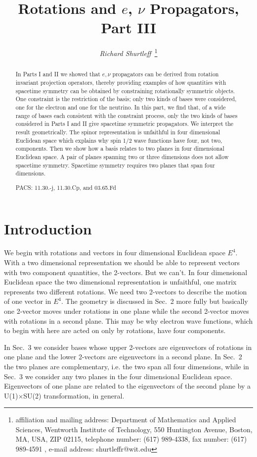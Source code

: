 \documentclass[a4paper,12pt]{article}
\title{ Rotations and $e$, $\nu$ Propagators, Part III}
\author{{\it Richard Shurtleff~}\thanks{affiliation and mailing 
address: Department of Mathematics and Applied Sciences, 
Wentworth Institute of Technology, 550 Huntington Avenue, 
Boston, MA, USA, ZIP 02115, telephone number: (617) 989-4338, fax 
number: (617) 989-4591 , e-mail address: shurtleffr@wit.edu}}
\begin{document}
 
          
\maketitle               
			\begin{abstract}  

In Parts I and II we showed that $e, \nu$ propagators can be derived from rotation invariant projection operators, thereby providing examples of how quantities with spacetime symmetry can be obtained by constraining rotationally symmetric objects. One constraint is the restriction of the basis; only two kinds of bases were considered, one for the electron and one for the neutrino. In this part, we find that, of a wide range of bases each consistent with the constraint process, only the two kinds of bases considered in Parts I and II give spacetime symmetric propagators. We interpret the result geometrically. The spinor representation is unfaithful in four dimensional Euclidean space which explains why spin 1/2 wave functions have four, not two, components. Then we show how a basis relates to two planes in four dimensional Euclidean space. A pair of planes spanning two or three dimensions does not allow spacetime symmetry. Spacetime symmetry requires two planes that span four dimensions.   

	PACS: 11.30.-j, 11.30.Cp, and 03.65.Fd 
 
		\end{abstract}
\pagebreak

\section{Introduction} \label{intro} %

	We begin with rotations and vectors in four dimensional Euclidean space $E^{4}.$ With a two dimensional representation we should be able to represent vectors with two component quantities, the 2-vectors. But we can't. In four dimensional Euclidean space the two dimensional representation is unfaithful, one matrix represents two different rotations. We need two 2-vectors to describe the motion of one vector in $E^{4}.$ The geometry is discussed in Sec.~2 more fully but basically one 2-vector moves under rotations in one plane while the second 2-vector moves with rotations in a second plane. This may be why electron wave functions, which to begin with here are acted on only by rotations, have four components.  

	In Sec.~3 we consider bases whose upper 2-vectors are eigenvectors of rotations in one plane and the lower 2-vectors are eigenvectors in a second plane. In Sec.~2 the two planes are complementary, i.e. the two span all four dimensions, while in Sec.~3 we consider any two planes in the four dimensional Euclidean space. Eigenvectors of one plane are related to the eigenvectors of the second plane by a U(1)$\times$SU(2) transformation, in general. 
\end{document}
